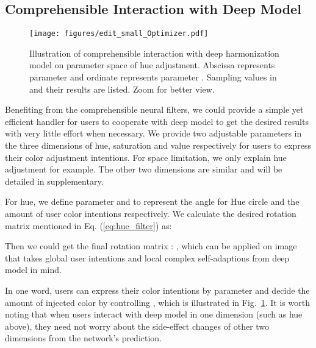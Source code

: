 \documentclass[runningheads]{llncs}
\begin{document}
    
    
    \subsection{Comprehensible Interaction with Deep Model}
    
    \begin{figure}[!thb]
    \centering
    \texttt{[image: figures/edit\_small\_Optimizer.pdf]}
    \caption{Illustration of comprehensible interaction with deep harmonization model on parameter space of hue adjustment.
    Abscissa represents parameter  and ordinate represents parameter .
    Sampling values in  and their results are listed.
    Zoom for better view.
    }
    \vspace{-20pt}
    \label{fig:edit_filter}
    \end{figure}
    
     Benefiting from the comprehensible neural filters, we could provide a simple yet efficient handler for users to cooperate with deep model to get the desired results with very little effort when necessary.
    We provide two adjustable parameters 
    in the three dimensions of hue, saturation and value respectively for users to express their color adjustment intentions.
    For space limitation, we only explain hue adjustment for example.
    The other two dimensions are similar and will be detailed in supplementary.
    
    For hue, we define parameter  and  to represent the angle for Hue circle and the amount of user color intentions respectively.
    We calculate the desired rotation matrix  mentioned in Eq. (\ref{eq:hue_filter}) as:
    
    
    
    
    Then we could get the final rotation matrix : , which can be applied on image that takes global user intentions and local complex self-adaptions from deep model in mind.
    
    In one word, users can express their color intentions by parameter  and decide the amount of injected color by controlling , which is illustrated in Fig.~\ref{fig:edit_filter}.
    It is worth noting that when users interact with deep model in one dimension (such as hue above), they need not worry about the side-effect changes of other two dimensions from the network's prediction.
    
    
    
\end{document}
